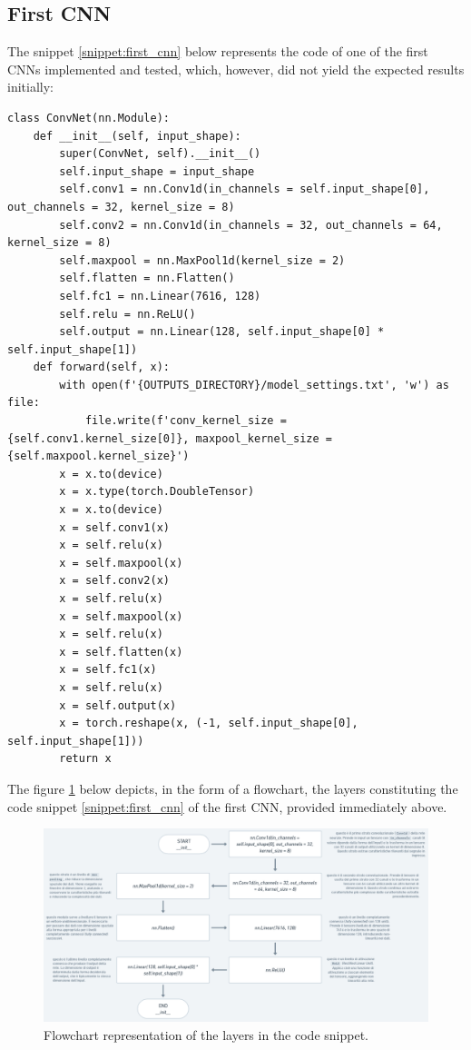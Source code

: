 \documentclass[12pt,italian]{report}
\begin{document}
\subsection{First CNN}
\label{subsec:first_cnn}

The snippet \ref{snippet:first_cnn} below represents the code of one of the first CNNs implemented and tested, which, however, did not yield the expected results initially:

\lstset{language=Python}
\begin{lstlisting}[aboveskip=15pt, belowskip=15pt, basicstyle=\fontsize{8}{10}\selectfont, keywordstyle=\color{blue}, breaklines=true, label=snippet:first_cnn]
class ConvNet(nn.Module):
    def __init__(self, input_shape):
        super(ConvNet, self).__init__()
        self.input_shape = input_shape
        self.conv1 = nn.Conv1d(in_channels = self.input_shape[0], out_channels = 32, kernel_size = 8)
        self.conv2 = nn.Conv1d(in_channels = 32, out_channels = 64, kernel_size = 8)
        self.maxpool = nn.MaxPool1d(kernel_size = 2)
        self.flatten = nn.Flatten()
        self.fc1 = nn.Linear(7616, 128)
        self.relu = nn.ReLU()
        self.output = nn.Linear(128, self.input_shape[0] * self.input_shape[1])
    def forward(self, x):
        with open(f'{OUTPUTS_DIRECTORY}/model_settings.txt', 'w') as file:
            file.write(f'conv_kernel_size = {self.conv1.kernel_size[0]}, maxpool_kernel_size = {self.maxpool.kernel_size}')
        x = x.to(device)
        x = x.type(torch.DoubleTensor)
        x = x.to(device)
        x = self.conv1(x)
        x = self.relu(x)
        x = self.maxpool(x)
        x = self.conv2(x)
        x = self.relu(x)
        x = self.maxpool(x)
        x = self.relu(x)
        x = self.flatten(x)
        x = self.fc1(x)
        x = self.relu(x)
        x = self.output(x)
        x = torch.reshape(x, (-1, self.input_shape[0], self.input_shape[1]))
        return x
\end{lstlisting}

The figure \ref{fig:first_cnn_layers} below depicts, in the form of a flowchart, the layers constituting the code snippet \ref{snippet:first_cnn} of the first CNN, provided immediately above.

\begin{figure}[H]
    \centering
    \includegraphics[width=1\textwidth]{images/first_cnn_layers.png}
    \captionsetup{justification=centering}
        \caption{Flowchart representation of the layers in the code snippet.}
    \label{fig:first_cnn_layers}
\end{figure}
\end{document}
